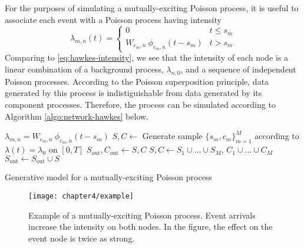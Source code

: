 		For the purposes of simulating a mutually-exciting Poisson process, it is useful to associate each event with a Poisson process having intensity
		\begin{equation}
			\lambda_{m,n}(t) = \begin{cases}
						             0 & t \le s_m \\
						             W_{c_m, n} \ \phi_{c_m, n}(t - s_m) & t > s_m
						      		 \end{cases}
		\end{equation}
		Comparing to \eqref{eq:hawkes-intensity}, we see that the intensity of each node is a linear combination of a background process, $\lambda_{n,0}$, and a sequence of independent Poisson processes. According to the Poisson superposition principle, data generated by this process is indistiguishable from data generated by its component processes. Therefore, the process can be simulated according to Algorithm \ref{algo:network-hawkes} below.

		\begin{algorithm}
				\begin{algorithmic}
					\vspace{1mm}
					\STATE $\lambda_{m,n} = W_{c_m,n} \ \phi_{c_m,n}(t - s_m)$
					\STATE $S, C \gets$ Generate sample $\{s_m, c_m\}_{m=1}^M$ according to $\lambda(t) = \lambda_0$ on $[0, T]$
					\STATE $S_{\text{out}}, C_{\text{out}} \gets S, C$
					\REPEAT
						\ENDFOR
						\STATE $S, C \gets S_1 \cup \dots \cup S_M$, $C_1 \cup \dots \cup C_M$
						\STATE $S_{\text{out}} \gets S_{\text{out}} \cup S$
			\end{algorithmic}
			\caption{Generative model for a mutually-exciting Poisson process}
			\label{algo:network-hawkes}
		\end{algorithm}

		\begin{figure}[t]
			\small
			\linespread{1}
			\centering
			\label{fig:example_chapter4}
			\texttt{[image: chapter4/example]}
			\captionsetup{skip=-20pt, labelsep=colon, font=footnotesize, width=\linewidth}
			\caption[Example of a mutually-exciting Poisson process.]{Example of a mutually-exciting Poisson process. Event arrivals increase the intensity on both nodes. In the figure, the effect on the event node is twice as strong.}
		\end{figure}

